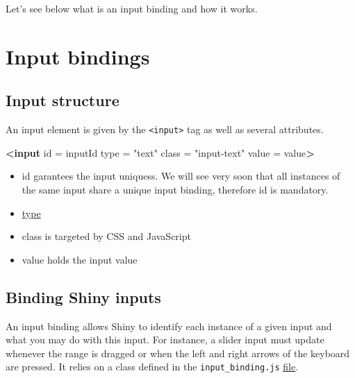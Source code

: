 \documentclass[
]{book}
\newenvironment{Shaded}{\begin{snugshade}}{\end{snugshade}}
\newcommand{\KeywordTok}[1]{\textcolor[rgb]{0.13,0.29,0.53}{\textbf{#1}}}
\newcommand{\OtherTok}[1]{\textcolor[rgb]{0.56,0.35,0.01}{#1}}
\newcommand{\StringTok}[1]{\textcolor[rgb]{0.31,0.60,0.02}{#1}}
\providecommand{\tightlist}{%
  \setlength{\itemsep}{0pt}\setlength{\parskip}{0pt}}
\begin{document}
Let's see below what is an input binding and how it works.

\hypertarget{input-bindings}{%
\section{Input bindings}\label{input-bindings}}

\hypertarget{input-structure}{%
\subsection{Input structure}\label{input-structure}}

An input element is given by the \texttt{\textless{}input\textgreater{}} tag as well as several attributes.

\begin{Shaded}
\begin{Highlighting}[]
\KeywordTok{<input}\OtherTok{ id} \OtherTok{=} \StringTok{inputId}\OtherTok{ type} \OtherTok{=} \StringTok{"text"}\OtherTok{ class} \OtherTok{=} \StringTok{"input-text"}\OtherTok{ value} \OtherTok{=} \StringTok{value}\KeywordTok{>}
\end{Highlighting}
\end{Shaded}

\begin{itemize}
\tightlist
\item
  id garantees the input uniquess. We will see very soon that all instances of the same input share a unique input binding, therefore id is mandatory.
\item
  \href{https://www.w3schools.com/tags/att_input_type.asp}{type}
\item
  class is targeted by CSS and JavaScript
\item
  value holds the input value
\end{itemize}

\hypertarget{binding-shiny-inputs}{%
\subsection{Binding Shiny inputs}\label{binding-shiny-inputs}}

An input binding allows Shiny to identify each instance of a given input and what you may do with this input. For instance, a slider input must update whenever the range is dragged or when the left and right arrows of the keyboard are pressed. It relies on a class defined in the \texttt{input\_binding.js} \href{https://github.com/rstudio/shiny/blob/master/srcjs/input_binding.js}{file}.
\end{document}
